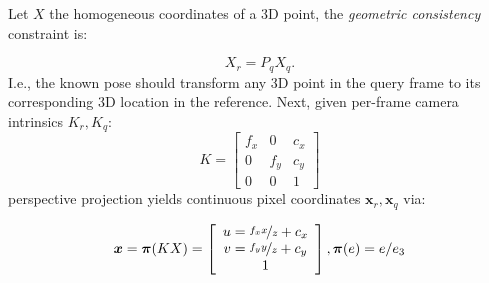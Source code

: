 Let $X$ the homogeneous coordinates of a 3D point, the \emph{geometric consistency} constraint is:

\begin{equation}\label{eq:geometric_constraint}
X_r = P_q X_q.
\end{equation}
I.e., the known pose should transform any 3D point in the query frame to its corresponding 3D location in the reference.
Next, given per-frame camera intrinsics $K_r, K_q$:
\begin{equation}\label{eq:intrinsics}
    K = 
\left[\begin{array}{ccc}
f_{x} & 0 & c_{x} \\
0 & f_{y} & c_{y} \\
0 & 0 & 1
\end{array}\right]
\end{equation}
perspective projection yields continuous pixel coordinates $\bm{x}_r,\bm{x}_q$ via:

\begin{equation}\label{eq:backward_model}
\bm{x}
=
\bm{\pi}(KX)
=
\left[\begin{array}{c}
u = \nicefrac{f_x x}{z} + c_x\\
v = \nicefrac{f_y y}{z} + c_y\\
1
\end{array}\right],
\bm{\pi}(e) = e / e_3
\end{equation}

